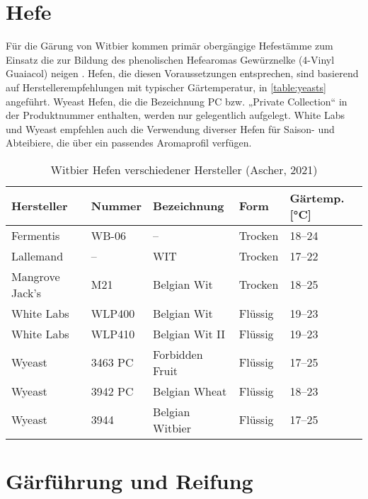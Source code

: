 \documentclass[a4paper,parskip=half]{scrartcl}
\begin{document}
\section*{Hefe}

Für die Gärung von Witbier kommen primär obergängige Hefestämme
zum Einsatz die zur Bildung des phenolischen Hefearomas
Gewürznelke (4-Vinyl Guaiacol) neigen \parencite[46]{Roncoroni2018}.
Hefen, die diesen Voraussetzungen entsprechen, sind
basierend auf Herstellerempfehlungen mit typischer Gärtemperatur,
in \autoref{table:yeasts} angeführt. Wyeast Hefen, die die
Bezeichnung PC bzw. „Private Collection“ in der Produktnummer enthalten,
werden nur gelegentlich aufgelegt. White Labs und Wyeast empfehlen
auch die Verwendung diverser Hefen für Saison- und Abteibiere,
die über ein passendes Aromaprofil verfügen.

\begin{table}[H]
\centering
\begin{tabular}{lllll}
\toprule
Hersteller      & Nummer  & Bezeichnung          & Form    & Gärtemp. [°C] \\
\midrule
Fermentis       & WB-06   & –                    & Trocken & 18–24        \\
Lallemand       & –       & WIT                  & Trocken & 17–22        \\
Mangrove Jack's & M21     & Belgian Wit          & Trocken & 18–25        \\
White Labs      & WLP400  & Belgian Wit          & Flüssig & 19–23        \\
White Labs      & WLP410  & Belgian Wit II       & Flüssig & 19–23        \\
Wyeast          & 3463 PC & Forbidden Fruit      & Flüssig & 17–25        \\
Wyeast          & 3942 PC & Belgian Wheat        & Flüssig & 18–23        \\
Wyeast          & 3944    & Belgian Witbier      & Flüssig & 17–25        \\
\bottomrule
\end{tabular}
\caption{Witbier Hefen verschiedener Hersteller (Ascher, 2021)}
\label{table:yeasts}
\end{table}


\section*{Gärführung und Reifung}
\end{document}
